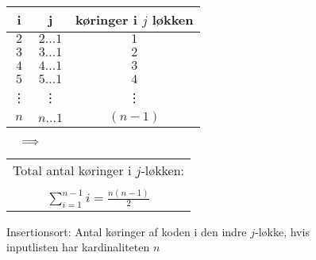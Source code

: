 \begin{figure}[b]
	\begin{center}
		\padtable
		\begin{tabular}{ c|c|c }
			i & j & køringer i $j$ løkken\\
			\hline
			$2$ & $2 \dots 1$ & $1$\\
			$3$ & $3 \dots 1$ & $2$\\
			$4$ & $4 \dots 1$ & $3$\\
			$5$ & $5 \dots 1$ & $4$\\
			\vdots & \vdots & \vdots\\
			$n$ & $n \dots 1$ & $(n-1)$\\
		\end{tabular}
		$\:\:\:\:\:\: \Longrightarrow \:\:\:\:\:\: $	
		\begin{tabular}{c}
			Total antal køringer i $j$-løkken:\\
			\vspace{-4mm}
			\\
			$\displaystyle\sum_{i=1}^{n-1}i=\frac{n(n-1)}{2}$
		\end{tabular}
	\end{center}
	\caption{Insertionsort: Antal køringer af koden i den indre $j$-løkke, hvis inputlisten har kardinaliteten $n$}
	\label{fig:Insertionsort Operationer i løkker}
\end{figure}


